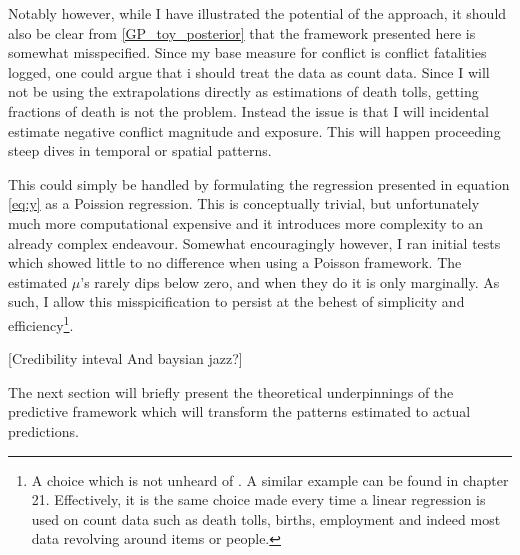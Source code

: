 \documentclass[a4paper]{article}
\begin{document}

Notably however, while I have illustrated the potential of the approach, it should also be clear from \autoref{GP_toy_posterior} that the framework presented here is somewhat misspecified. Since my base measure for conflict is conflict fatalities logged, one could argue that i should treat the data as count data. Since I will not be using the extrapolations directly as estimations of death tolls, getting fractions of death is not the problem. Instead the issue is that I will incidental estimate negative conflict magnitude and exposure. This will happen proceeding steep dives in temporal or spatial patterns.\par

This could simply be handled by formulating the regression presented in equation \ref{eq:y} as a Poission regression. This is conceptually trivial, but unfortunately much more computational expensive and it introduces more complexity to an already complex endeavour. Somewhat encouragingly however, I ran initial tests which showed little to no difference when using a Poisson framework. The estimated $\mu$'s rarely dips below zero, and when they do it is only marginally. As such, I allow this misspicification to persist at the behest of simplicity and efficiency\footnote{A choice which is not unheard of  \cite[123]{williams2006gaussian}. A similar example can be found in \cite{Gelman_2013} chapter 21. Effectively, it is the same choice made every time a linear regression is used on count data such as death tolls, births, employment and indeed most data revolving around items or people.}.\par %

[Credibility inteval And baysian jazz?]\par

The next section will briefly present the theoretical underpinnings of the predictive framework which will transform the patterns estimated to actual predictions.\par 
\end{document}
